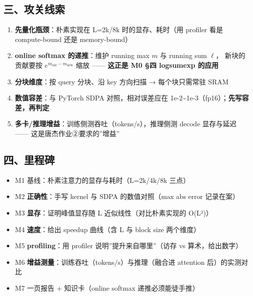 \documentclass[
  chinese,
  11pt,
]{ctexart}
\providecommand{\tightlist}{%
  \setlength{\itemsep}{0pt}\setlength{\parskip}{0pt}}
\begin{document}
\subsection{三、攻关线索}\label{ux4e09ux653bux5173ux7ebfux7d22}

\begin{enumerate}
\def\labelenumi{\arabic{enumi}.}
\tightlist
\item
  \textbf{先量化瓶颈}：朴素实现在 L=2k/8k 时的显存、耗时（用 profiler 看是 compute-bound 还是 memory-bound）
\item
  \textbf{online softmax 的递推}：维护 running max \(m\) 与 running sum \(\ell\)， 新块的贡献要按 \(e^{m_{\text{old}}-m_{\text{new}}}\) 缩放 ------ \textbf{这正是 M0 §四 logsumexp 的应用}
\item
  \textbf{分块维度}：按 query 分块、沿 key 方向扫描 → 每个块只需常驻 SRAM
\item
  \textbf{数值容差}：与 PyTorch SDPA 对照，相对误差应在 1e-2\textasciitilde1e-3（fp16）；\textbf{先写容差，再判定}
\item
  \textbf{多卡/推理增益}：训练侧测吞吐（tokens/s），推理侧测 decode 显存与延迟 ------ 这是唐杰作业②要求的''增益''
\end{enumerate}

\subsection{四、里程碑}\label{ux56dbux91ccux7a0bux7891}

\begin{itemize}
\tightlist
\item[$\square$]
  M1 基线：朴素注意力的显存与耗时（L=2k/4k/8k 三点）
\item[$\square$]
  M2 \textbf{正确性}：手写 kernel 与 SDPA 的数值对照（max abs error 记录在案）
\item[$\square$]
  M3 \textbf{显存}：证明峰值显存随 L 近似线性（对比朴素实现的 O(L²)）
\item[$\square$]
  M4 \textbf{速度}：给出 speedup 曲线（含 L 与 block size 两个维度）
\item[$\square$]
  M5 \textbf{profiling}：用 profiler 说明''提升来自哪里''（访存 vs 算术，给出数字）
\item[$\square$]
  M6 \textbf{增益测量}：训练吞吐（tokens/s）与推理（融合进 attention 后）的实测对比
\item[$\square$]
  M7 一页报告 + 知识卡（online softmax 递推必须能徒手推）
\end{itemize}
\end{document}
